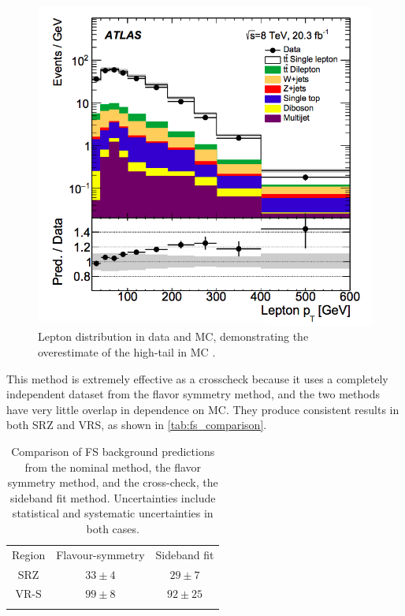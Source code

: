 \begin{centering}
\begin{figure}[!hbt]
\myfloatalign
\includegraphics[width=.85\linewidth]{figures/fs/ttbar_mismodeling.png}
\caption{Lepton \pt distribution in data and \ac{MC}, demonstrating the overestimate of the high-\pt tail in \ac{MC} \cite{Aad:2015hna}.}
\label{fig:fs_mc_met}
\end{figure}
\end{centering}

This method is extremely effective as a crosscheck because it uses a completely independent dataset from the flavor symmetry method, and the two methods have very little overlap in dependence on \ac{MC}. They produce consistent results in both SRZ and VRS, as shown in \autoref{tab:fs_comparison}.


\begin{table}[h]
\centering

\begin{tabular}{ccc}
\noalign{\smallskip}\hline\noalign{\smallskip}
Region  & Flavour-symmetry  & Sideband fit  \\
\noalign{\smallskip}\hline\hline\noalign{\smallskip}
SRZ & $33 \pm 4$   &  $29 \pm 7$  \\ [+0.05cm]
VR-S & $99\pm8$        &  $92 \pm 25$  \\ [+0.05cm]
\noalign{\smallskip}\hline\hline
\end{tabular}
\caption{ Comparison of \ac{FS} background predictions from the nominal method, the flavor symmetry method, and the cross-check, the sideband fit method. Uncertainties include statistical and systematic uncertainties in both cases. }
\label{tab:fs_comparison}
\end{table}

